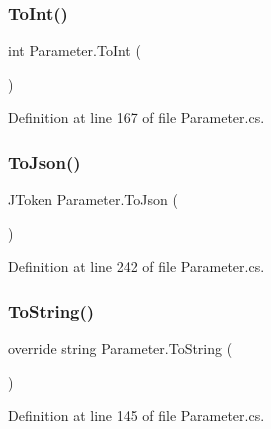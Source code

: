 \mbox{\label{class_parameter_ac191bcdd26956fae2fe0f0364de6cea1}} 
\subsubsection{\texorpdfstring{To\+Int()}{ToInt()}}
{\footnotesize\ttfamily int Parameter.\+To\+Int (\begin{DoxyParamCaption}{ }\end{DoxyParamCaption})}



Definition at line 167 of file Parameter.\+cs.

\mbox{\label{class_parameter_ab1b13eeee0c6828f5b894ee44e9dad96}} 
\subsubsection{\texorpdfstring{To\+Json()}{ToJson()}}
{\footnotesize\ttfamily J\+Token Parameter.\+To\+Json (\begin{DoxyParamCaption}{ }\end{DoxyParamCaption})}



Definition at line 242 of file Parameter.\+cs.

\mbox{\label{class_parameter_a0f4313d453da2e93bd797289b4d5bce0}} 
\subsubsection{\texorpdfstring{To\+String()}{ToString()}\hspace{0.1cm}{\footnotesize\ttfamily [1/2]}}
{\footnotesize\ttfamily override string Parameter.\+To\+String (\begin{DoxyParamCaption}{ }\end{DoxyParamCaption})}



Definition at line 145 of file Parameter.\+cs.

\mbox{\label{class_parameter_ad4eab6d65a6757bf3667fc985e115098}} 
